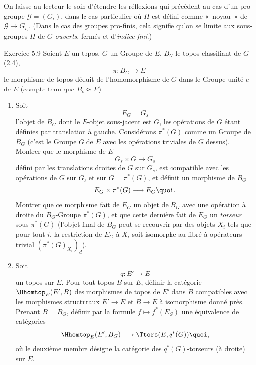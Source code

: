\documentclass[10pt]{../fichiers-configuration-latex/smfart}
\begin{document}
\subsubsection{}
On laisse au lecteur le soin d'étendre les réflexions qui
précèdent au cas d'un pro-groupe $𝒢=(G_i)$, dans le cas
particulier où $H$ est défini comme « noyau »  de
$𝒢\rightarrow G_{i_{\circ}}$. (Dans le cas des groupes
pro-finis, cela signifie qu'on se limite aux sous-groupes $H$ de $G$
\emph{ouverts}, \ie fermés et d'\emph{indice fini}.)

\begin{enonce*}[remark]{Exercice 5.9}
Soient $E$ un topos, $G$ un Groupe de $E$, $B_G$ le topos
classifiant de $G$ (\hyperref[IV.subsec2.4]{2.4}),
$$
\pi:B_G\longrightarrow E
$$
le morphisme de topos déduit de l'homomorphisme de $G$ dans le
Groupe unité $e$ de $E$ (compte tenu que $B_e\approx E$).
\begin{enumerate}
\renewcommand{\theenumi}{\alph{enumi}}
\renewcommand{\labelenumi}{\theenumi)}
\item Soit
$$
E_G=G_s
$$
l'objet de $B_G$ dont le $E$-objet sous-jacent est $G$, les
opérations de $G$ étant définies par translation à gauche.
Considérons $\pi^{\ast}(G)$ comme un Groupe de $B_G$ (c'est le
Groupe $G$ de $E$ avec les opérations triviales de $G$ dessus).
Montrer que le morphisme de $E$
$$
G_s\times G\longrightarrow G_s
$$
défini par les translations droites de $G$ sur $G_s$, est
compatible avec les opérations de $G$ sur $G_s$ et sur
$G=\pi^{\ast}(G)$, et définit un morphisme de $B_G$
$$
E_G\times \pi^{\ast}(G)\longrightarrow E_G{\quoi}.
$$
Montrer que ce morphisme fait de $E_G$ un objet de $B_G$ avec une
opération à droite du $B_G$-Groupe $\pi^{\ast}(G)$, et que cette
dernière fait de $E_G$ un \emph{torseur} sous\pageoriginale
$\pi^{\ast}(G)$ (\ie l'objet final de $B_G$ peut se recouvrir par
des objets $X_i$ tels que pour tout $i$, la restriction de $E_G$ à
$X_i$ soit isomorphe au fibré à opérateurs trivial
$(\pi^{\ast}(G)_{X_i})_d$).

\item Soit
$$
q:E'\longrightarrow E
$$
un topos sur $E$. Pour tout topos $B$ sur $E$, définir la
catégorie $\Hhomtop_E(E',B)$ des morphismes de topos de $E'$ dans
$B$ compatibles avec les morphismes structuraux $E'\rightarrow E$ et
$B\rightarrow E$ à isomorphisme donné près. Prenant $B=B_G$,
définir par la formule $f\mapsto f^{\ast}(E_G)$ une équivalence
de catégories
$$
\Hhomtop_E(E',B_G)\longrightarrow \Ttors(E,q^{\ast}(G)){\quoi},
$$
où le deuxième membre désigne la catégorie des
$q^{\ast}(G)$-torseurs (à droite) sur $E$.


\end{enumerate}
\end{enonce*}
\end{document}
